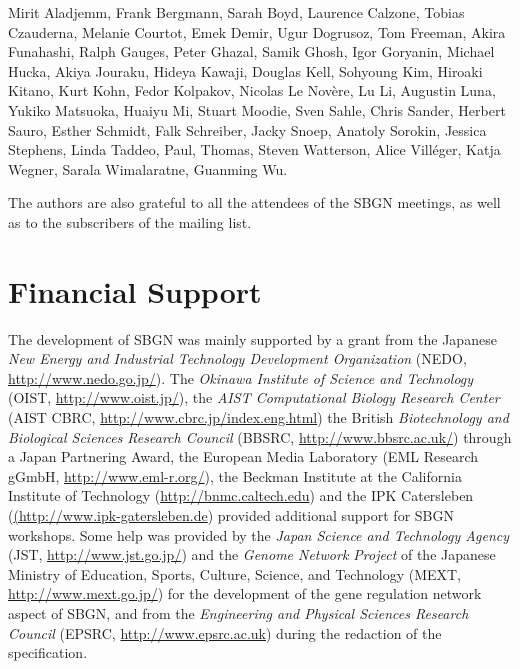 Mirit Aladjemm, Frank Bergmann, Sarah Boyd, Laurence Calzone, Tobias Czauderna, Melanie Courtot, Emek Demir, Ugur Dogrusoz, Tom Freeman, Akira Funahashi, Ralph
Gauges, Peter Ghazal, Samik Ghosh, Igor Goryanin, Michael Hucka, Akiya Jouraku, Hideya Kawaji, Douglas Kell, Sohyoung Kim, Hiroaki Kitano, Kurt
Kohn, Fedor Kolpakov, Nicolas Le Nov\`{e}re, Lu Li, Augustin Luna, Yukiko Matsuoka, Huaiyu Mi, Stuart Moodie, Sven Sahle, Chris Sander, Herbert
Sauro, Esther Schmidt, Falk Schreiber, Jacky Snoep, Anatoly Sorokin, Jessica Stephens, Linda Taddeo, Paul, Thomas, Steven Watterson, Alice Vill\'{e}ger, Katja
Wegner, Sarala Wimalaratne, Guanming Wu.

The authors are also grateful to all the attendees of the SBGN meetings, as well as to the subscribers of the  mailing list.

\section{Financial Support}

The development of SBGN was mainly supported by a grant from the Japanese \emph{New Energy and Industrial Technology Development Organization} (NEDO, \url{http://www.nedo.go.jp/}).  The \emph{Okinawa Institute of Science and Technology} (OIST, \url{http://www.oist.jp/}), the \emph{AIST Computational Biology Research Center} (AIST CBRC, \url{http://www.cbrc.jp/index.eng.html}) the British \emph{Biotechnology and Biological Sciences Research Council} (BBSRC, \url{http://www.bbsrc.ac.uk/}) through a Japan Partnering Award, the European Media Laboratory (EML Research gGmbH, \url{http://www.eml-r.org/}), the Beckman Institute at the California Institute of Technology (\url{http://bnmc.caltech.edu}) and the IPK Catersleben (\url{(http://www.ipk-gatersleben.de}) provided additional support for SBGN workshops.  Some help was provided by the \emph{Japan Science and Technology Agency} (JST, \url{http://www.jst.go.jp/}) and the \emph{Genome Network Project} of the Japanese Ministry of Education, Sports, Culture, Science, and Technology (MEXT, \url{http://www.mext.go.jp/}) for the development of the gene regulation network aspect of SBGN, and from the \emph{Engineering and Physical Sciences Research Council} (EPSRC, \url{http://www.epsrc.ac.uk}) during the redaction of the specification.